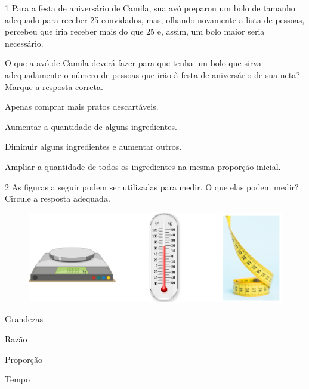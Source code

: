 \num{1} Para a festa de aniversário de Camila, sua avó preparou um bolo de tamanho adequado para receber 25 convidados, mas, olhando novamente a
lista de pessoas, percebeu que iria receber mais do que 25 e, assim, um bolo maior seria necessário.

O que a avó de Camila deverá fazer para que tenha um bolo que sirva
adequadamente o número de pessoas que irão à festa de aniversário de sua neta? Marque a resposta correta.

\begin{escolha}
\item
  Apenas comprar mais pratos descartáveis.
\item
  Aumentar a quantidade de alguns ingredientes.
\item
  Diminuir alguns ingredientes e aumentar outros.
\item
  Ampliar a quantidade de todos os ingredientes na mesma proporção inicial.
\end{escolha}



\num{2} As figuras a seguir podem ser utilizadas para medir. O que elas podem medir? Circule a resposta adequada.

\begin{figure}[htpb!]
\centering
\includegraphics[width=.8\textwidth]{../ilustracoes/MAT5/SAEB_5ANO_MAT_figura78.png}
\end{figure}

\begin{escolha}
\item
  Grandezas
\item
  Razão
\item
  Proporção
\item
  Tempo
\end{escolha}

